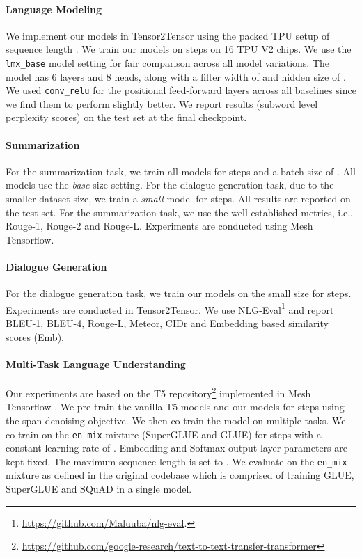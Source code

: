 \documentclass{article} \usepackage{iclr2021_conference,times}
\begin{document}
\paragraph{Language Modeling} We implement our models in Tensor2Tensor using the packed TPU setup of sequence length . We train our models on  steps on 16 TPU V2 chips. We use the \texttt{lmx\_base} model setting for fair comparison across all model variations. The model has 6 layers and 8 heads, along with a filter width of  and hidden size of . We used \texttt{conv\_relu} for the positional feed-forward layers across all baselines since we find them to perform slightly better. We report results (subword level perplexity scores) on the test set at the final checkpoint. 

\paragraph{Summarization} For the summarization task, we train all models for  steps and a batch size of . All models use the \textit{base} size setting. For the dialogue generation task, due to the smaller dataset size, we train a \textit{small} model for  steps. All results are reported on the test set. For the summarization task, we use the well-established metrics, i.e., Rouge-1, Rouge-2 and Rouge-L. Experiments are conducted using Mesh Tensorflow.

\paragraph{Dialogue Generation} For the dialogue generation task, we train our models on the small size for  steps. Experiments are conducted in Tensor2Tensor. We use NLG-Eval\footnote{\url{https://github.com/Maluuba/nlg-eval}.} \citep{sharma2017nlgeval} and report BLEU-1, BLEU-4, Rouge-L, Meteor, CIDr and Embedding based similarity scores (Emb). 

\paragraph{Multi-Task Language Understanding} Our experiments are based on the T5 repository\footnote{\url{https://github.com/google-research/text-to-text-transfer-transformer}} implemented in Mesh Tensorflow \citep{shazeer2018mesh}. We pre-train the vanilla T5 models and our models for  steps using the span denoising objective. We then co-train the model on multiple tasks. We co-train on the \texttt{en\_mix} mixture (SuperGLUE and GLUE) for  steps with a constant learning rate of . Embedding and Softmax output layer parameters are kept fixed. The maximum sequence length is set to . We evaluate on the \texttt{en\_mix} mixture as defined in the original codebase which is comprised of training GLUE, SuperGLUE and SQuAD in a single model.
\end{document}
